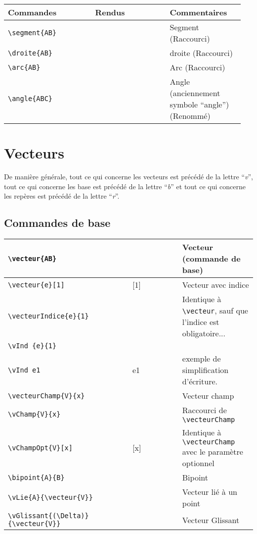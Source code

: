 \documentclass[a4paper,10pt]{article}
\newcommand{\rac}{({\color{red}Raccourci})}
\newcommand{\ren}{({\color{blue}Renommé})}
\begin{document}
	\noindent
	\begin{tabular}{|p{0.35\linewidth}|p{0.3\linewidth}|p{0.3\linewidth}|}
		\hline
			\textbf{Commandes}&\textbf{Rendus}&\textbf{Commentaires}
		\\\hline\hline
			\verb!\segment{AB}!	&	\segment{AB}		&	Segment \rac
		\\\hline
			\verb!\droite{AB}!	&	\droite{AB}		&	droite \rac
		\\\hline
			\verb!\arc{AB}!		&	\arc{AB}			&	Arc \rac
		\\\hline
			\verb!\angle{ABC}!		&	\angle{ABC}		&	Angle (anciennement symbole ``angle'') \ren
		\\\hline
	\end{tabular}


	\section{Vecteurs}

	De manière générale, tout ce qui concerne les vecteurs est précédé de la lettre ``\emph{v}'',
	tout ce qui concerne les base est précédé de la lettre ``\emph{b}''
	et tout ce qui concerne les repères est précédé de la lettre ``\emph{r}''.


	\subsection{Commandes de base}
	\noindent
	\begin{tabular}{|p{0.5\linewidth}|p{0.2\linewidth}|p{0.3\linewidth}|}
		\hline
			\verb!\vecteur{AB}!		&	\vecteur{AB}		&	Vecteur (commande de base)
		\\\hline
			\verb!\vecteur{e}[1]!		&	\vecteur{e}[1]		&	Vecteur avec indice
		\\\hline
			\verb!\vecteurIndice{e}{1}!	&	\vecteurIndice{e}{1}	&	Identique à \verb!\vecteur!, sauf que l'indice est obligatoire...
		\\\hline
			\verb!\vInd {e}{1}!		&	\vecteurIndice{e}{1}	&	
		\\\hline
			\verb!\vInd e1!			&	\vInd e1		&	exemple de simplification d'écriture.
		\\\hline
			\verb!\vecteurChamp{V}{x}!	&	\vecteurChamp{V}{x}	&	Vecteur champ
		\\\hline
			\verb!\vChamp{V}{x}!		&	\vChamp{V}{x}		&	Raccourci de \verb!\vecteurChamp!
		\\\hline
			\verb!\vChampOpt{V}[x]!		&	\vChampOpt{V}[x]	&	Identique à \verb!\vecteurChamp! avec le paramètre optionnel
		\\\hline
			\verb!\bipoint{A}{B}!		&	\bipoint{A}{B}		&	Bipoint
		\\\hline
			\verb!\vLie{A}{\vecteur{V}}!	&	\vLie{A}{\vecteur{V}}	&	Vecteur lié à un point 
		\\\hline
			\verb!\vGlissant{(\Delta)}{\vecteur{V}}!&\vGlissant{(\Delta)}{\vecteur{V}}	&	Vecteur Glissant
		\\\hline
	\end{tabular}
\end{document}
